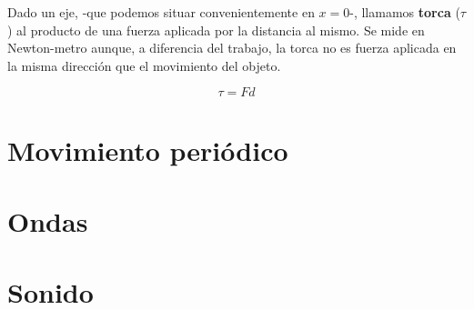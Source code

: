 \documentclass[12pt]{article}
\begin{document}
Dado un eje,
-que podemos situar convenientemente en \(x=0\)-,
llamamos \textbf{torca} (\(\tau\)) al producto de una fuerza aplicada por la distancia al mismo.
Se mide en Newton-metro aunque,
a diferencia del trabajo,
la torca no es fuerza aplicada en la misma dirección que el movimiento del objeto.

\begin{equation}
	\tau = Fd
\end{equation}


\pagebreak

\section{Movimiento periódico}

\pagebreak

\section{Ondas}

\pagebreak

\section{Sonido}
\end{document}
